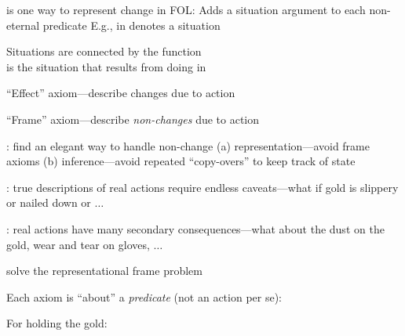 \documentclass{article}
\begin{document}
\begin{huge}
 is one way to represent change in FOL:\nl
   Adds a situation argument to each non-eternal predicate\nl
   E.g.,  in  denotes a situation

Situations are connected by the  function\\
 is the situation that results from doing  in 

\textwidth
{}




``Effect'' axiom---describe changes due to action\\

``Frame'' axiom---describe \emph{non-changes} due to action\\

: find an elegant way to handle non-change\nl
   (a) representation---avoid frame axioms\nl
   (b) inference---avoid repeated ``copy-overs'' to keep track of state

: true descriptions of real actions require endless caveats---what if gold is slippery or nailed down or $\ldots$

: real actions have many secondary consequences---what about the dust on the gold, wear and tear on gloves, $\ldots$



 solve the representational frame problem 

Each axiom is ``about'' a \emph{predicate} (not an action per se):

For holding the gold:\al
   \nl
      \mat{$[(a\eq Grab \land AtGold(s))$}\nl
      \mat{${}\lor (Holding(Gold,s) \land a\neq Release)]$}



\end{huge}
\end{document}
